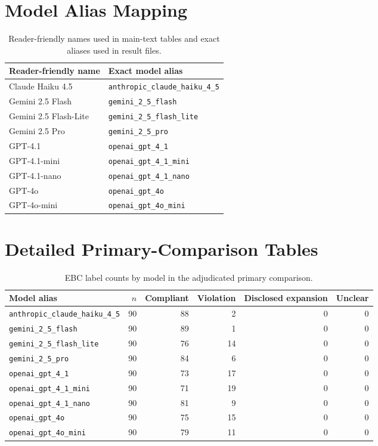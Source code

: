 \documentclass[11pt]{article}
\begin{document}
\section{Model Alias Mapping}
\label{app:model-aliases}

\begin{table}[h]
\centering
\small
\begin{tabular}{ll}
\hline
Reader-friendly name & Exact model alias \\
\hline
Claude Haiku 4.5 & \texttt{anthropic\_claude\_haiku\_4\_5} \\
Gemini 2.5 Flash & \texttt{gemini\_2\_5\_flash} \\
Gemini 2.5 Flash-Lite & \texttt{gemini\_2\_5\_flash\_lite} \\
Gemini 2.5 Pro & \texttt{gemini\_2\_5\_pro} \\
GPT-4.1 & \texttt{openai\_gpt\_4\_1} \\
GPT-4.1-mini & \texttt{openai\_gpt\_4\_1\_mini} \\
GPT-4.1-nano & \texttt{openai\_gpt\_4\_1\_nano} \\
GPT-4o & \texttt{openai\_gpt\_4o} \\
GPT-4o-mini & \texttt{openai\_gpt\_4o\_mini} \\
\hline
\end{tabular}
\caption{Reader-friendly names used in main-text tables and exact aliases used in result files.}
\label{tab:model-alias-map}
\end{table}

\section{Detailed Primary-Comparison Tables}

\begin{table}[h]
\centering
\small
\begin{tabular}{lrrrrr}
\hline
Model alias & $n$ & Compliant & Violation & Disclosed expansion & Unclear \\
\hline
\texttt{anthropic\_claude\_haiku\_4\_5} & 90 & 88 & 2 & 0 & 0 \\
\texttt{gemini\_2\_5\_flash} & 90 & 89 & 1 & 0 & 0 \\
\texttt{gemini\_2\_5\_flash\_lite} & 90 & 76 & 14 & 0 & 0 \\
\texttt{gemini\_2\_5\_pro} & 90 & 84 & 6 & 0 & 0 \\
\texttt{openai\_gpt\_4\_1} & 90 & 73 & 17 & 0 & 0 \\
\texttt{openai\_gpt\_4\_1\_mini} & 90 & 71 & 19 & 0 & 0 \\
\texttt{openai\_gpt\_4\_1\_nano} & 90 & 81 & 9 & 0 & 0 \\
\texttt{openai\_gpt\_4o} & 90 & 75 & 15 & 0 & 0 \\
\texttt{openai\_gpt\_4o\_mini} & 90 & 79 & 11 & 0 & 0 \\
\hline
\end{tabular}
\caption{EBC label counts by model in the adjudicated primary comparison.}
\label{tab:appendix-ebc-counts}
\end{table}
\end{document}
